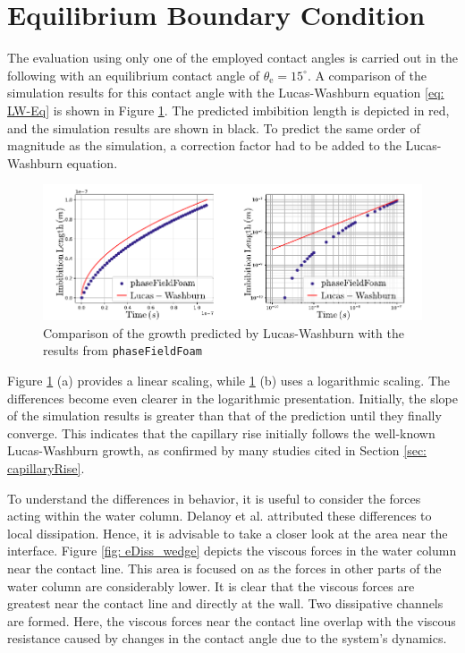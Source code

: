 \section{Equilibrium Boundary Condition} 
\label{sec: EquilibriumBoundaryCondition}
The evaluation using only one of the employed contact angles is carried out in the following with an equilibrium contact angle of $\theta_{\mathrm{e}}=15^{\circ}$. A comparison of the simulation results for this contact angle with the Lucas-Washburn equation \ref{eq: LW-Eq} is shown in Figure \ref{fig: LW-PFF_comp}. The predicted imbibition length is depicted in red, and the simulation results are shown in black. To predict the same order of magnitude as the simulation, a correction factor had to be added to the Lucas-Washburn equation.
\begin{figure}[h]
    \centering
    \includegraphics[width=.95\textwidth]{Pictures/LW-lin_loglog.pdf}
    \caption{Comparison of the growth predicted by Lucas-Washburn with the results from \texttt{phaseFieldFoam}}
    \label{fig: LW-PFF_comp}
\end{figure}
Figure \ref{fig: LW-PFF_comp} (a) provides a linear scaling, while \ref{fig: LW-PFF_comp} (b) uses a logarithmic scaling. The differences become even clearer in the logarithmic presentation. Initially, the slope of the simulation results is greater than that of the prediction until they finally converge. This indicates that the capillary rise initially follows the well-known Lucas-Washburn growth, as confirmed by many studies cited in Section \ref{sec: capillaryRise}.

To understand the differences in behavior, it is useful to consider the forces acting within the water column. Delanoy et al. \cite{delannoy2019DualRoleViscosity} attributed these differences to local dissipation. Hence, it is advisable to take a closer look at the area near the interface. Figure \ref{fig: eDiss_wedge} depicts the viscous forces in the water column near the contact line. This area is focused on as the forces in other parts of the water column are considerably lower. It is clear that the viscous forces are greatest near the contact line and directly at the wall. Two dissipative channels are formed. Here, the viscous forces near the contact line overlap with the viscous resistance caused by changes in the contact angle due to the system's dynamics. 

